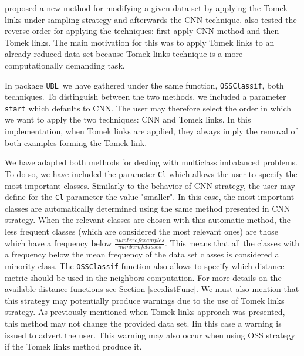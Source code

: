 \documentclass[10pt,a4paper]{article}\usepackage[]{graphicx}\usepackage[]{color}
\newcommand{\UBL}{package \texttt{UBL}\ }
\begin{document}
\cite{KM97} proposed a new method for modifying a given data set by applying the Tomek links under-sampling strategy and afterwards the CNN technique. \cite{batista2004study} also tested the reverse order for applying the techniques: first apply CNN method and then Tomek links. The main motivation for this was to apply Tomek links to an already reduced data set because Tomek links technique is a more computationally demanding task.

In \UBL we have gathered under the same function, \texttt{OSSClassif}, both techniques. To distinguish between the two methods, we included a parameter \texttt{start} which defaults to CNN. The user may therefore select the order in which we want to apply the two techniques: CNN and Tomek links. In this implementation, when Tomek links are applied, they always imply the removal of both examples forming the Tomek link. 

We have adapted both methods for dealing with multiclass imbalanced problems. To do so, we have included the parameter \texttt{Cl} which allows the user to specify the most important classes. Similarly to the behavior of CNN strategy, the user may define for the \texttt{Cl} parameter the value "smaller". In this case, the most important classes are automatically determined using the same method presented in CNN strategy. When the relevant classes are chosen with this automatic method, the less frequent classes (which are considered the most relevant ones) are those which have a frequency below $\frac{number of examples}{number of classes}$. This means that all the classes with a frequency below the mean frequency of the data set classes is considered a minority class. The \texttt{OSSClassif} function also allows to specify which distance metric should be used in the neighbors computation. For more details on the available distance functions see Section \ref{sec:distFunc}. We must also mention that this strategy may potentially produce warnings due to the use of Tomek links strategy. As previously mentioned when Tomek links approach was presented, this method may not change the provided data set. Iin this case a warning is issued to advert the user. This warning may also occur when using OSS strategy if the Tomek links method produce it.
\end{document}
